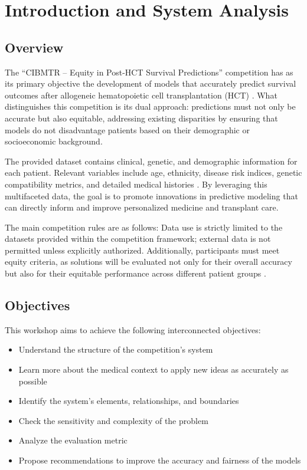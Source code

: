 \chapter{Introduction and System Analysis}

\section{Overview}

The ``CIBMTR – Equity in Post-HCT Survival Predictions'' competition has as its primary objective the development of models that accurately predict survival outcomes after allogeneic hematopoietic cell transplantation (HCT) \cite{kaggle_competition}. What distinguishes this competition is its dual approach: predictions must not only be accurate but also equitable, addressing existing disparities by ensuring that models do not disadvantage patients based on their demographic or socioeconomic background.

\vspace{0.3cm}

The provided dataset contains clinical, genetic, and demographic information for each patient. Relevant variables include age, ethnicity, disease risk indices, genetic compatibility metrics, and detailed medical histories \cite{cibmtr_datasets}. By leveraging this multifaceted data, the goal is to promote innovations in predictive modeling that can directly inform and improve personalized medicine and transplant care.

\vspace{0.3cm}

The main competition rules are as follows: Data use is strictly limited to the datasets provided within the competition framework; external data is not permitted unless explicitly authorized. Additionally, participants must meet equity criteria, as solutions will be evaluated not only for their overall accuracy but also for their equitable performance across different patient groups \cite{kaggle_competition}.

\vspace{0.3cm}

\section{Objectives}

This workshop aims to achieve the following interconnected objectives:
\begin{itemize}
    \item Understand the structure of the competition's system
    \item Learn more about the medical context to apply new ideas as accurately as possible
    \item Identify the system's elements, relationships, and boundaries
    \item Check the sensitivity and complexity of the problem
    \item Analyze the evaluation metric
    \item Propose recommendations to improve the accuracy and fairness of the models
\end{itemize}

